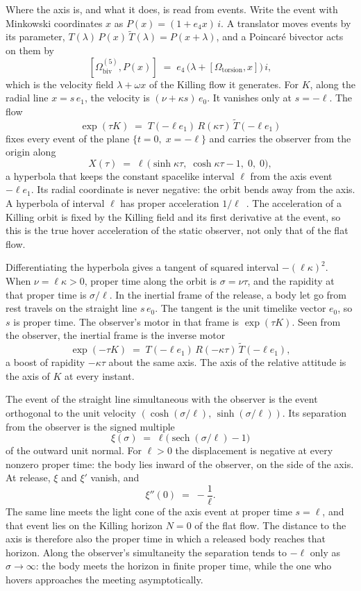 \documentclass[a4paper]{article}
\begin{document}
Where the axis is, and what it does, is read from events. Write the event with Minkowski coordinates \(x\) as \(P(x)=(1+e_{4}x)\,i\). A translator moves events by its parameter, \(T(\lambda)\,P(x)\,\widetilde{T}(\lambda)=P(x+\lambda)\), and a Poincar\'{e} bivector acts on them by
\[
[\Omega_{\mathrm{biv}}^{(5)},P(x)] \;=\; e_{4}\,\bigl(\lambda+[\Omega_{\mathrm{torsion}},x]\bigr)\,i,
\]
which is the velocity field \(\lambda+\omega x\) of the Killing flow it generates. For \(K\), along the radial line \(x=s\,e_{1}\), the velocity is \((\nu+\kappa s)\,e_{0}\). It vanishes only at \(s=-\ell\). The flow
\[
\exp(\tau K) \;=\; T(-\ell e_{1})\,R(\kappa\tau)\,\widetilde{T}(-\ell e_{1})
\]
fixes every event of the plane \(\{t=0,\;x=-\ell\}\) and carries the observer from the origin along
\[
X(\tau) \;=\; \ell\,\bigl(\sinh\kappa\tau,\;\cosh\kappa\tau-1,\;0,\;0\bigr),
\]
a hyperbola that keeps the constant spacelike interval \(\ell\) from the axis event \(-\ell e_{1}\). Its radial coordinate is never negative: the orbit bends away from the axis. A hyperbola of interval \(\ell\) has proper acceleration \(1/\ell\)~\cite{Rindler1966}. The acceleration of a Killing orbit is fixed by the Killing field and its first derivative at the event, so this is the true hover acceleration of the static observer, not only that of the flat flow.

Differentiating the hyperbola gives a tangent of squared interval \(-(\ell\kappa)^{2}\). When \(\nu=\ell\kappa>0\), proper time along the orbit is \(\sigma=\nu\tau\), and the rapidity at that proper time is \(\sigma/\ell\). In the inertial frame of the release, a body let go from rest travels on the straight line \(s\,e_{0}\). The tangent is the unit timelike vector \(e_{0}\), so \(s\) is proper time. The observer's motor in that frame is \(\exp(\tau K)\). Seen from the observer, the inertial frame is the inverse motor
\[
\exp(-\tau K) \;=\; T(-\ell e_{1})\,R(-\kappa\tau)\,\widetilde{T}(-\ell e_{1}),
\]
a boost of rapidity \(-\kappa\tau\) about the same axis. The axis of the relative attitude is the axis of \(K\) at every instant.

The event of the straight line simultaneous with the observer is the event orthogonal to the unit velocity \((\cosh(\sigma/\ell),\,\sinh(\sigma/\ell))\). Its separation from the observer is the signed multiple
\begin{equation}
\xi(\sigma) \;=\; \ell\bigl(\operatorname{sech}(\sigma/\ell)-1\bigr)
\label{eq:fall-displacement}
\end{equation}
of the outward unit normal. For \(\ell>0\) the displacement is negative at every nonzero proper time: the body lies inward of the observer, on the side of the axis. At release, \(\xi\) and \(\xi'\) vanish, and
\[
\xi''(0) \;=\; -\frac{1}{\ell}.
\]
The same line meets the light cone of the axis event at proper time \(s=\ell\), and that event lies on the Killing horizon \(N=0\) of the flat flow. The distance to the axis is therefore also the proper time in which a released body reaches that horizon. Along the observer's simultaneity the separation tends to \(-\ell\) only as \(\sigma\to\infty\): the body meets the horizon in finite proper time, while the one who hovers approaches the meeting asymptotically.
\end{document}
